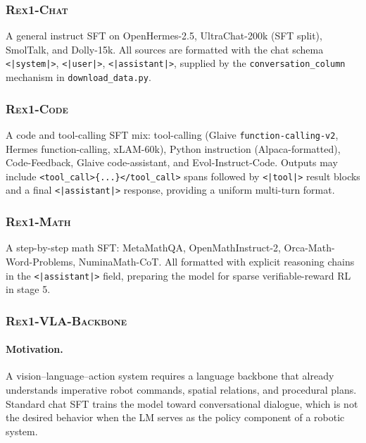 \documentclass[11pt,a4paper]{article}
\begin{document}
\subsubsection{\textsc{Rex1-Chat}}

A general instruct SFT on OpenHermes-2.5, UltraChat-200k (SFT split),
SmolTalk, and Dolly-15k. All sources are formatted with the chat schema
\texttt{<|system|>}, \texttt{<|user|>}, \texttt{<|assistant|>}, supplied by
the \texttt{conversation\_column} mechanism in \texttt{download\_data.py}.

\subsubsection{\textsc{Rex1-Code}}

A code and tool-calling SFT mix: tool-calling (Glaive
\texttt{function-calling-v2}, Hermes function-calling, xLAM-60k), Python
instruction (Alpaca-formatted), Code-Feedback, Glaive code-assistant, and
Evol-Instruct-Code. Outputs may include \texttt{<tool\_call>\{...\}</tool\_call>}
spans followed by \texttt{<|tool|>} result blocks and a final
\texttt{<|assistant|>} response, providing a uniform multi-turn format.

\subsubsection{\textsc{Rex1-Math}}

A step-by-step math SFT: MetaMathQA, OpenMathInstruct-2, Orca-Math-Word-Problems,
NuminaMath-CoT. All formatted with explicit reasoning chains in the
\texttt{<|assistant|>} field, preparing the model for sparse verifiable-reward
RL in stage 5.

\subsubsection{\textsc{Rex1-VLA-Backbone}}

\paragraph{Motivation.}
A vision–language–action system requires a language backbone that already
understands imperative robot commands, spatial relations, and procedural
plans. Standard chat SFT trains the model toward conversational dialogue,
which is not the desired behavior when the LM serves as the policy
component of a robotic system.
\end{document}

